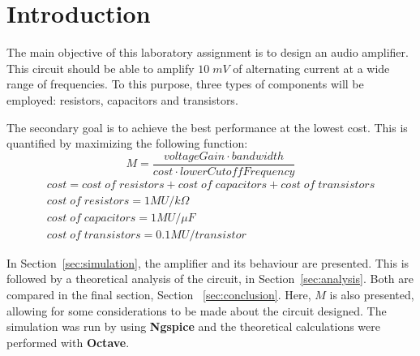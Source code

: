 \newpage

\section{Introduction}
\label{sec:introduction}


The main objective of this laboratory assignment is to design an audio amplifier. This circuit should be able to amplify $10\;mV$ of alternating current at a wide range of frequencies. To this purpose, three types of components will be employed: resistors, capacitors and transistors.

The secondary goal is to achieve the best performance at the lowest cost. This is quantified by maximizing the following function:
\begin{equation}
  M = \frac{voltageGain \cdot bandwidth}{cost \cdot lowerCutoffFrequency}
\end{equation}
\begin{gather*}
  cost = cost\;of\;resistors + cost\;of\;capacitors + cost\;of\;transistors \\
  cost\;of\;resistors = 1 MU/k\Omega \\
  cost\;of\;capacitors = 1 MU/\mu F \\
  cost\;of\;transistors = 0.1 MU/transistor
\end{gather*}

In Section~\ref{sec:simulation}, the amplifier and its behaviour are presented. This is followed by a theoretical analysis of the circuit, in Section~\ref{sec:analysis}. Both are compared in the final section, Section ~\ref{sec:conclusion}. Here, $M$ is also presented, allowing for some considerations to be made about the circuit designed. The simulation was run by using {\bf Ngspice} and the theoretical calculations were performed with {\bf Octave}.
